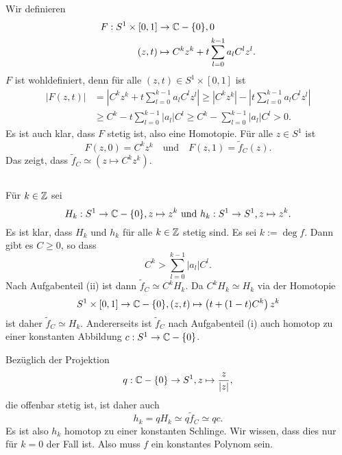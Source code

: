 \documentclass[a4paper,10pt]{article}
\begin{document}
\subsection{}
Wir definieren
\begin{align*}
 F : S^1 \times [0,1] &\to \mathbb{C} - \{0\},0\\
 (z,t) &\mapsto C^k z^k + t \sum_{l=0}^{k-1} a_l C^l z^l.
\end{align*}
$F$ ist wohldefiniert, denn für alle $(z,t) \in S^1 \times [0,1]$ ist
\begin{align*}
 |F(z,t)|
 &=  \left| C^k z^k + t \sum_{l=0}^{k-1} a_l C^l z^l \right|
 \geq \left| C^k z^k \right| - \left| t \sum_{l=0}^{k-1} a_l C^l z^l \right| \\
 &\geq C^k - t \sum_{l=0}^{k-1} |a_l| C^l
 \geq C^k - \sum_{l=0}^{k-1} |a_l| C^l
 > 0.
\end{align*}
Es ist auch klar, dass $F$ stetig ist, also eine Homotopie. Für alle $z \in S^1$ ist
\[
 F(z,0) = C^k z^k \quad \text{und} \quad F(z,1) = \tilde{f}_C(z).
\]
Das zeigt, dass $\tilde{f}_C \simeq \left(z \mapsto C^k z^k\right)$.


\subsection{}
Für $k \in \mathbb{Z}$ sei
\[
 H_k : S^1 \to \mathbb{C} - \{0\}, z \mapsto z^k \text{ und }
 h_k : S^1 \to S^1, z \mapsto z^k.
\]
Es ist klar, dass $H_k$ und $h_k$ für alle $k \in \mathbb{Z}$ stetig sind. Es sei $k := \deg f$.
Dann gibt es $C \geq 0$, so dass
\[
 C^k > \sum_{l=0}^{k-1} |a_l| C^l.
\]
Nach Aufgabenteil (ii) ist dann $\tilde{f}_C \simeq C^k H_k$. Da $C^k H_k \simeq H_k$ via der Homotopie
\[
 S^1 \times [0,1] \to \mathbb{C} - \{0\}, (z,t) \mapsto  \left(t + (1-t)C^k\right) z^k
\]
ist daher $\tilde{f}_C \simeq H_k$. Andererseits ist $\tilde{f}_C$ nach Aufgabenteil (i) auch homotop zu einer konstanten Abbildung $c : S^1 \to \mathbb{C} - \{0\}$.

Bezüglich der Projektion
\[
 q : \mathbb{C} - \{0\} \to S^1, z \mapsto \frac{z}{|z|},
\]
die offenbar stetig ist, ist daher auch
\[
 h_k = q H_k \simeq q \tilde{f}_C \simeq q c.
\]
Es ist also $h_k$ homotop zu einer konstanten Schlinge. Wir wissen, dass dies nur für $k = 0$ der Fall ist. Also muss $f$ ein konstantes Polynom sein.
\end{document}
